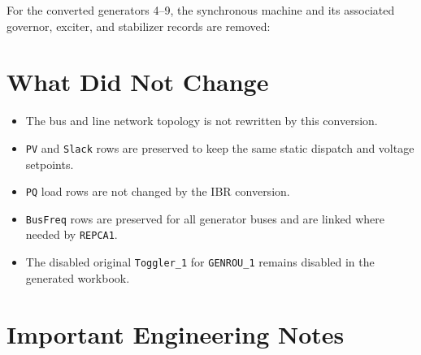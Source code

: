 \documentclass[10pt,letterpaper]{article}
\begin{document}
For the converted generators 4--9, the synchronous machine and its associated
governor, exciter, and stabilizer records are removed:

\begin{center}
\end{center}

\section{What Did Not Change}

\begin{itemize}
  \item The bus and line network topology is not rewritten by this conversion.
  \item \texttt{PV} and \texttt{Slack} rows are preserved to keep the same
  static dispatch and voltage setpoints.
  \item \texttt{PQ} load rows are not changed by the IBR conversion.
  \item \texttt{BusFreq} rows are preserved for all generator buses and are
  linked where needed by \texttt{REPCA1}.
  \item The disabled original \texttt{Toggler\_1} for \texttt{GENROU\_1} remains
  disabled in the generated workbook.
\end{itemize}

\section{Important Engineering Notes}
\end{document}
